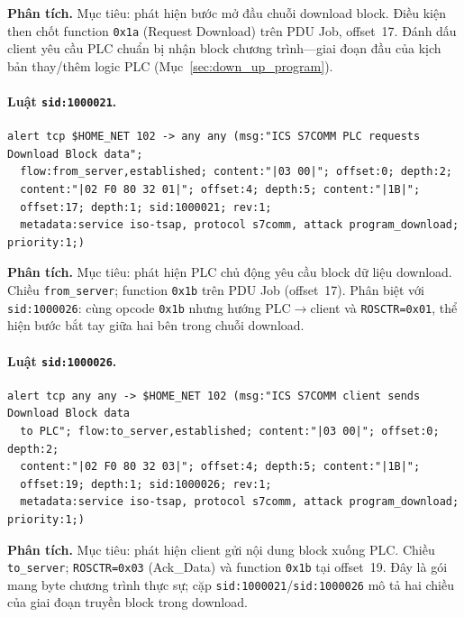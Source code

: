 \documentclass[../main.tex]{subfiles}
\begin{document}
\noindent\textbf{Phân tích.}
Mục tiêu: phát hiện bước mở đầu chuỗi download block. Điều kiện then chốt function \texttt{0x1a} (Request Download) trên PDU Job, offset~17. Đánh dấu client yêu cầu PLC chuẩn bị nhận block chương trình---giai đoạn đầu của kịch bản thay/thêm logic PLC (Mục~\ref{sec:down_up_program}).

\paragraph{Luật \texttt{sid:1000021}.}
\begin{footnotesize}
\begin{verbatim}
alert tcp $HOME_NET 102 -> any any (msg:"ICS S7COMM PLC requests Download Block data";
  flow:from_server,established; content:"|03 00|"; offset:0; depth:2;
  content:"|02 F0 80 32 01|"; offset:4; depth:5; content:"|1B|";
  offset:17; depth:1; sid:1000021; rev:1;
  metadata:service iso-tsap, protocol s7comm, attack program_download; priority:1;)
\end{verbatim}
\end{footnotesize}

\noindent\textbf{Phân tích.}
Mục tiêu: phát hiện PLC chủ động yêu cầu block dữ liệu download. Chiều \texttt{from\_server}; function \texttt{0x1b} trên PDU Job (offset~17). Phân biệt với \texttt{sid:1000026}: cùng opcode \texttt{0x1b} nhưng hướng PLC$\rightarrow$client và \texttt{ROSCTR=0x01}, thể hiện bước bắt tay giữa hai bên trong chuỗi download.

\paragraph{Luật \texttt{sid:1000026}.}
\begin{footnotesize}
\begin{verbatim}
alert tcp any any -> $HOME_NET 102 (msg:"ICS S7COMM client sends Download Block data
  to PLC"; flow:to_server,established; content:"|03 00|"; offset:0; depth:2;
  content:"|02 F0 80 32 03|"; offset:4; depth:5; content:"|1B|";
  offset:19; depth:1; sid:1000026; rev:1;
  metadata:service iso-tsap, protocol s7comm, attack program_download; priority:1;)
\end{verbatim}
\end{footnotesize}

\noindent\textbf{Phân tích.}
Mục tiêu: phát hiện client gửi nội dung block xuống PLC. Chiều \texttt{to\_server}; \texttt{ROSCTR=0x03} (Ack\_Data) và function \texttt{0x1b} tại offset~19. Đây là gói mang byte chương trình thực sự; cặp \texttt{sid:1000021}/\texttt{sid:1000026} mô tả hai chiều của giai đoạn truyền block trong download.
\end{document}
